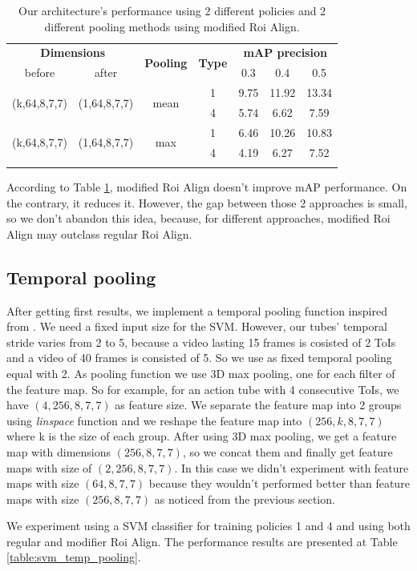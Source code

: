 \documentclass{report}
\begin{document}
\begin{center}
\begin{longtable}{||c | c | c| c||c c c||}

  \hline
  \multicolumn{2}{||c|}{\textbf{Dimensions}} & \multirow{2}{*}{ \textbf{Pooling}} &\multirow{2}{*}{\textbf{Type}} & \multicolumn{3}{|c||}{\textbf{mAP precision}}\\

   before & after &  {} & {} &  0.3 &  0.4 & 0.5 \\
 \hline   \hline
 \multirow{2}{*}{(k,64,8,7,7)} & \multirow{2}{*}{(1,64,8,7,7)} & \multirow{2}{*}{mean}  & 1 & 9.75 & 11.92 & 13.34 \\
  \cline{4-7}
  {} & {} & {} & 4 &  5.74 &6.62 & 7.59 \\
  \hline
 \multirow{2}{*}{(k,64,8,7,7)} & \multirow{2}{*}{(1,64,8,7,7)} & \multirow{2}{*}{max}  & 1 &  6.46 & 10.26 & 10.83 \\
    \cline{4-7}
  {} & {} & {} & 4 & 4.19 & 6.27 & 7.52 \\
    \cline{4-7}
  \hline
  \caption{Our architecture's performance using 2 different policies and 2 different pooling methods using modified Roi Align.}
  \label{table:svm_mod_roialign}

\end{longtable} 
\end{center}

According to Table \ref{table:svm_mod_roialign}, modified Roi Align doesn't improve mAP performance. On the contrary, it reduces it.
However, the gap between those 2 approaches is small, so we don't abandon this idea, because, for different approaches,
modified Roi Align may outclass regular Roi Align.

\subsection{Temporal pooling}
After getting first results, we implement a temporal pooling function inspired from \cite{DBLP:journals/corr/HouCS17}. We need a
fixed input size for the SVM. However, our tubes' temporal stride varies from 2 to 5, because a video lasting 15 frames
is cosisted of 2 ToIs and a video of 40 frames is consisted of 5. So we use as fixed temporal pooling equal
with 2. As pooling function we use 3D max pooling, one for each filter of the feature map.  So for example, for an action tube
with 4 consecutive ToIs, we  have $(4,256,8,7,7)$ as feature size. We separate the feature map into 2 groups using \textit{linspace}
function and we reshape the feature map into $(256,k,8,7,7)$ where k is the size of each group. After using 3D max pooling, we get
a feature map with dimensions $(256,8,7,7)$, so we concat them and finally get feature maps with size of $(2,256,8,7,7)$.
In this case we didn't experiment with feature maps with size $(64,8,7,7)$ because they wouldn't performed better than  feature maps with size $(256,8,7,7)$ as noticed from the previous section. \par
We experiment using a SVM classifier for training policies 1 and 4 and using both regular and modifier Roi Align. The
performance results are presented at Table \ref{table:svm_temp_pooling}.
\end{document}
